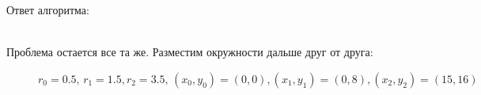 \documentclass[12pt,twoside]{article}
\begin{document}
Ответ алгоритма: \\
\begin{figure}[h]
\end{figure}\\
Проблема остается все та же. \newpage Разместим окружности дальше друг от друга: 
\begin{figure}[h!]
\caption{$r_0 = 0.5, \, r_1 = 1.5, r_2 = 3.5, \, (x_0, y_0) = (0, 0), (x_1, y_1) = (0, 8), (x_2, y_2) = (15, 16)$}
\end{figure} \\ 
\end{document}
